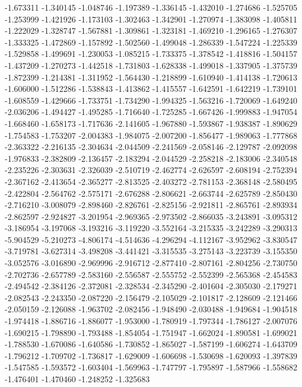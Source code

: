 -1.673311
-1.340145
-1.048746
-1.197389
-1.336145
-1.432010
-1.274686
-1.525705
-1.253999
-1.421926
-1.173103
-1.302463
-1.342901
-1.270974
-1.383098
-1.405811
-1.222029
-1.328747
-1.567881
-1.309861
-1.323181
-1.469210
-1.296165
-1.276307
-1.333325
-1.472869
-1.157892
-1.502560
-1.499048
-1.286339
-1.547224
-1.225339
-1.529858
-1.499691
-1.230053
-1.085215
-1.733375
-1.378542
-1.418816
-1.504157
-1.437209
-1.270273
-1.442518
-1.731803
-1.628338
-1.499018
-1.337905
-1.375739
-1.872399
-1.214381
-1.311952
-1.564430
-1.218899
-1.610940
-1.414138
-1.720613
-1.606000
-1.512286
-1.538843
-1.413862
-1.415557
-1.642591
-1.642219
-1.739101
-1.608559
-1.429666
-1.733751
-1.734290
-1.994325
-1.563216
-1.720069
-1.649240
-2.036206
-1.494427
-1.495285
-1.716640
-1.725285
-1.667426
-1.999883
-1.947054
-1.668460
-1.658173
-1.717636
-2.141605
-1.967880
-1.593867
-1.938387
-1.890629
-1.754583
-1.753207
-2.004383
-1.984075
-2.007200
-1.856477
-1.989063
-1.777868
-2.363322
-2.216135
-2.304634
-2.044509
-2.241569
-2.058146
-2.129787
-2.092098
-1.976833
-2.382809
-2.136457
-2.183294
-2.044529
-2.258218
-2.183006
-2.340548
-2.235226
-2.303631
-2.326039
-2.510719
-2.462774
-2.626597
-2.608194
-2.752394
-2.367162
-2.413654
-2.365277
-2.813525
-2.403272
-2.781153
-2.368148
-2.580495
-2.422804
-2.564762
-2.575171
-2.676288
-2.806621
-2.663744
-2.625789
-2.850430
-2.716210
-3.008079
-2.898460
-2.826761
-2.825156
-2.921811
-2.865761
-2.893934
-2.862597
-2.924827
-3.201954
-2.969365
-2.973502
-2.866035
-3.243891
-3.095312
-3.186954
-3.197068
-3.193216
-3.119220
-3.552164
-3.215335
-3.242289
-3.290313
-5.904529
-5.210273
-4.806174
-4.514636
-4.296294
-4.112167
-3.952962
-3.830547
-3.719781
-3.627314
-3.498208
-3.441421
-3.315535
-3.275143
-3.223739
-3.155350
-3.052576
-3.016890
-2.969996
-2.916712
-2.877410
-2.807161
-2.804256
-2.730750
-2.702736
-2.657789
-2.583160
-2.556587
-2.555752
-2.552399
-2.565368
-2.454583
-2.494542
-2.384126
-2.372081
-2.328534
-2.345290
-2.401604
-2.305030
-2.179271
-2.082543
-2.243350
-2.087220
-2.156479
-2.105029
-2.101817
-2.128609
-2.121466
-2.050159
-2.126088
-1.963702
-2.082456
-1.948490
-2.030488
-1.949684
-1.904518
-1.974418
-1.886716
-1.886077
-1.953000
-1.780919
-1.797344
-1.786127
-2.007076
-1.690215
-1.798890
-1.793488
-1.854054
-1.751947
-1.662024
-1.890581
-1.699021
-1.788530
-1.670086
-1.640586
-1.730852
-1.865027
-1.587199
-1.606274
-1.643709
-1.796212
-1.709702
-1.736817
-1.629009
-1.606698
-1.530698
-1.620093
-1.397839
-1.547585
-1.593572
-1.603404
-1.569963
-1.747797
-1.795897
-1.587966
-1.558682
-1.476401
-1.470460
-1.248252
-1.325683
